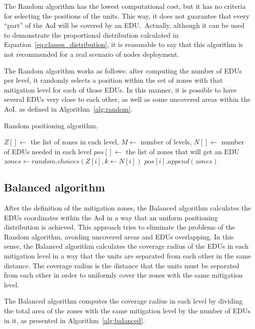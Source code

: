 \begin{refsection}
The Random algorithm has the lowest computational cost, but it has no criteria for selecting the positions of the units. This way, it does not guarantee that every ``part'' of the AoI will be covered by an EDU.\ Actually, although it can be used to demonstrate the proportional distribution calculated in Equation~\ref{eq:classes_distribution}, it is reasonable to say that this algorithm is not recommended for a real scenario of nodes deployment. 

The Random algorithm works as follows: after computing the number of EDUs per level, it randomly selects a position within the set of zones with that mitigation level for each of those EDUs. In this manner, it is possible to have several EDUs very close to each other, as well as some uncovered areas within the AoI, as defined in Algorithm~\ref{alg:random}.

\begin{algorithm}[ht]
  \caption{Random positioning algorithm.}\label{alg:random}
  \begin{algorithmic}
    \REQUIRE $Z[] \gets$ the list of zones in each level, $M \gets$ number of levels, $N[] \gets$ number of EDUs needed in each level
    \ENSURE $pos[] \gets$ the list of zones that will get an EDU
      \STATE $zones \gets random.choices(Z[i], k \gets N[i])$
      \STATE $pos[i].append(zones)$
    \ENDFOR
  \end{algorithmic}
\end{algorithm}


\subsection {Balanced algorithm}

After the definition of the mitigation zones, the Balanced algorithm calculates the EDUs coordinates within the AoI in a way that an uniform positioning distribution is achieved. This approach tries to eliminate the problems of the Random algorithm, avoiding uncovered areas and EDUs overlapping. In this sense, the Balanced algorithm calculates the coverage radius of the EDUs in each mitigation level in a way that the units are separated from each other in the same distance. The coverage radius is the distance that the units must be separated from each other in order to uniformly cover the zones with the same mitigation level. 

The Balanced algorithm computes the coverage radius in each level by dividing the total area of the zones with the same mitigation level by the number of EDUs in it, as presented in Algorithm~\ref{alg:balanced}. 


\end{refsection}
